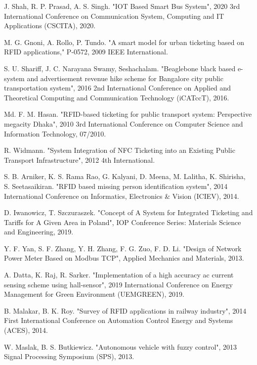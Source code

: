 \documentclass[conference]{IEEEtran}
\begin{document}
\begin{thebibliography}{99}
  
 J. Shah, R. P. Prasad, A. S. Singh. "IOT Based Smart Bus System", 2020 3rd International Conference on Communication System, Computing and IT Applications (CSCITA), 2020.

 M. G. Gnoni, A. Rollo, P. Tundo. "A smart model for urban ticketing based on RFID applications," P-0572, 2009 IEEE International.

 S. U. Shariff, J. C. Narayana Swamy, Seshachalam. "Beaglebone black based e-system and advertisement revenue hike scheme for Bangalore city public transportation system", 2016 2nd International Conference on Applied and Theoretical Computing and Communication Technology (iCATccT), 2016.

 Md. F. M. Hasan. "RFID-based ticketing for public transport system: Perspective megacity Dhaka", 2010 3rd International Conference on Computer Science and Information Technology, 07/2010.

 R. Widmann. "System Integration of NFC Ticketing into an Existing Public Transport Infrastructure", 2012 4th International.

 S. B. Arniker, K. S. Rama Rao, G. Kalyani, D. Meena, M. Lalitha, K. Shirisha, S. Seetasaikiran. "RFID based missing person identification system", 2014 International Conference on Informatics, Electronics \& Vision (ICIEV), 2014.

 D. Iwanowicz, T. Szczuraszek. "Concept of A System for Integrated Ticketing and Tariffs for A Given Area in Poland", IOP Conference Series: Materials Science and Engineering, 2019.

 Y. F. Yan, S. F. Zhang, Y. H. Zhang, F. G. Zuo, F. D. Li. "Design of Network Power Meter Based on Modbus TCP", Applied Mechanics and Materials, 2013.

 A. Datta, K. Raj, R. Sarker. "Implementation of a high accuracy ac current sensing scheme using hall-sensor", 2019 International Conference on Energy Management for Green Environment (UEMGREEN), 2019.

 B. Malakar, B. K. Roy. "Survey of RFID applications in railway industry", 2014 First International Conference on Automation Control Energy and Systems (ACES), 2014.

 W. Maslak, B. S. Butkiewicz. "Autonomous vehicle with fuzzy control", 2013 Signal Processing Symposium (SPS), 2013.


\end{thebibliography}
\end{document}
